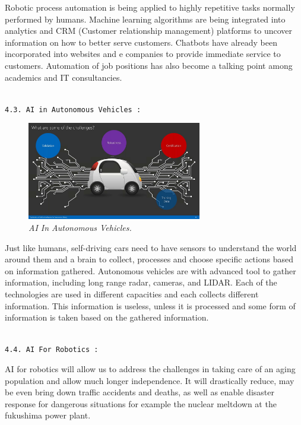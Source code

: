 \documentclass{article}
\begin{document}
Robotic process automation is being applied to highly repetitive tasks normally performed by humans. Machine learning algorithms are being integrated into analytics and CRM (Customer relationship management) platforms to uncover information on how to better serve customers. Chatbots have already been incorporated into websites and e companies to provide immediate service to customers. Automation of job positions has also become a talking point among academics and IT consultancies.\\\\

\begin{large}
\texttt{4.3. AI in Autonomous Vehicles :}
\end{large}
\begin{figure}
\centering
\includegraphics[width=3in]{AI Vehicle}

\caption{\textit{AI In Autonomous Vehicles.}}
\end{figure}

Just like humans, self-driving cars need to have sensors to understand the world around them and a brain to collect, processes and choose specific actions based on information gathered. Autonomous vehicles are with advanced tool to gather information, including long range radar, cameras, and LIDAR. Each of the technologies are used in different capacities and each collects different information. This information is useless, unless it is processed and some form of information is taken based on the gathered information.\\\\


\begin{large}
\texttt{4.4. AI For Robotics :}
\end{large}

AI for robotics will allow us to address the challenges in taking care of an aging population and allow much longer independence. It will drastically reduce, may be even bring down traffic accidents and deaths, as well as enable disaster response for dangerous situations for example the nuclear meltdown at the fukushima power plant.\\[2.5cm]
\end{document}

